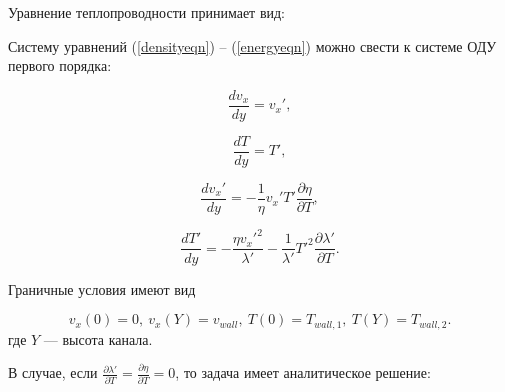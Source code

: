 \documentclass[12pt]{article}
\begin{document}
Уравнение теплопроводности принимает вид:


Систему уравнений (\ref{densityeqn}) -- (\ref{energyeqn}) можно свести к системе ОДУ первого порядка:


\begin{equation}
  \frac{d v_{x}}{d y} = v_{x}',\label{eqn-dimensional-dv}
\end{equation}

\begin{equation}
  \frac{d T}{d y} = T',\label{eqn-dimensional-dT}
\end{equation}

\begin{equation}
  \frac{d v_{x}'}{d y} = -\frac{1}{\eta} v_{x}' T' \frac{\partial \eta}{\partial T},\label{eqn-dimensional-d2v}
\end{equation}

\begin{equation}
   \frac{dT'}{dy} = -\frac{\eta v_{x}'^2}{\lambda'}
  - \frac{1}{\lambda'} T'^2 \frac{\partial \lambda'}{\partial T}.\label{eqn-dimensional-d2T}
\end{equation}

Граничные условия имеют вид

\begin{equation}
  v_{x}(0) = 0,\:v_{x}(Y) = v_{wall},\:T(0) = T_{wall,1},\:T(Y) = T_{wall,2}.
\end{equation}
где $Y$ --- высота канала.

В случае, если $\frac{\partial \lambda'}{\partial T} = \frac{\partial \eta}{\partial T} = 0$, то задача имеет аналитическое решение:
\end{document}
